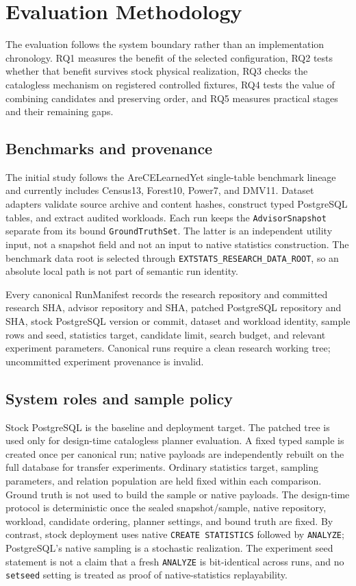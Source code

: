 \section{Evaluation Methodology}

The evaluation follows the system boundary rather than an implementation
chronology. RQ1 measures the benefit of the selected configuration, RQ2 tests
whether that benefit survives stock physical realization, RQ3 checks the
catalogless mechanism on registered controlled fixtures, RQ4 tests the value
of combining candidates and preserving order, and RQ5 measures practical
stages and their remaining gaps.

\subsection{Benchmarks and provenance}

The initial study follows the AreCELearnedYet single-table benchmark lineage
and currently includes Census13, Forest10, Power7, and DMV11. Dataset adapters
validate source archive and content hashes, construct typed PostgreSQL tables,
and extract audited workloads. Each run keeps the \texttt{AdvisorSnapshot}
separate from its bound \texttt{GroundTruthSet}. The latter is an independent
utility input, not a snapshot field and not an input to native statistics
construction. The benchmark data root is selected through
\texttt{EXTSTATS\_\allowbreak{}RESEARCH\_\allowbreak{}DATA\_\allowbreak{}ROOT}, so an absolute local path is not part
of semantic run identity.

Every canonical RunManifest records the research repository and committed
research SHA, advisor repository and SHA, patched PostgreSQL repository and
SHA, stock PostgreSQL version or commit, dataset and workload identity, sample
rows and seed, statistics target, candidate limit, search budget, and relevant
experiment parameters. Canonical runs require a clean research working tree;
uncommitted experiment provenance is invalid.

\subsection{System roles and sample policy}

Stock PostgreSQL is the baseline and deployment target. The patched tree is
used only for design-time catalogless planner evaluation. A fixed typed sample
is created once per canonical run; native payloads are independently rebuilt on
the full database for transfer experiments. Ordinary statistics target,
sampling parameters, and relation population are held fixed within each
comparison. Ground truth is not used to build the sample or native payloads.
The design-time protocol is deterministic once the sealed snapshot/sample,
native repository, workload, candidate ordering, planner settings, and bound
truth are fixed. By contrast, stock deployment uses native
\texttt{CREATE STATISTICS} followed by \texttt{ANALYZE}; PostgreSQL's native
sampling is a stochastic realization. The experiment seed statement is not a
claim that a fresh \texttt{ANALYZE} is bit-identical across runs, and no
\texttt{setseed} setting is treated as proof of native-statistics
replayability.

